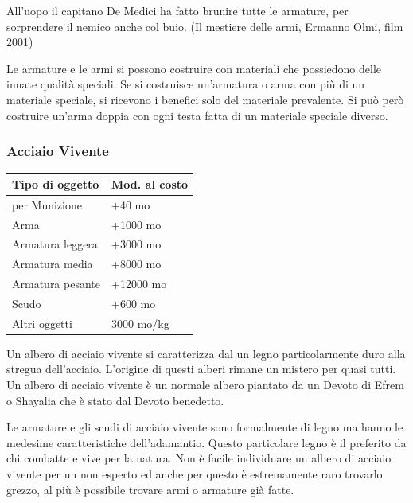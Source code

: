 \begin{enfasi}{
All'uopo il capitano De Medici ha fatto brunire tutte le armature, per sorprendere il nemico anche col buio. (Il mestiere delle armi, Ermanno Olmi, film 2001)}\end{enfasi}

\begin{multicols}{2}

Le armature e le armi si possono costruire con materiali che possiedono delle innate qualità speciali. Se si costruisce un'armatura o arma con più di un materiale speciale, si ricevono i benefici solo del materiale prevalente. Si può però costruire un'arma doppia con ogni testa fatta di un materiale speciale diverso.

\subsubsection{Acciaio Vivente}

\label{acciaio-vivente}

\noindent\begin{tabularx}{\linewidth}{Xl}
	\toprule
\textbf{Tipo di oggetto} & \textbf{Mod. al costo}\\
\toprule
per Munizione & +40 mo \\
Arma & +1000 mo\\
Armatura leggera & +3000 mo\\
Armatura media & +8000 mo\\
Armatura pesante & +12000 mo\\
Scudo & +600 mo\\
Altri oggetti & 3000 mo/kg
\end{tabularx}

\medskip
Un albero di acciaio vivente si caratterizza dal un legno particolarmente duro alla stregua dell'acciaio. L'origine di questi alberi rimane un mistero per quasi tutti. Un albero di acciaio vivente è un normale albero piantato da un Devoto di Efrem o Shayalia che è stato dal Devoto benedetto.

Le armature e gli scudi di acciaio vivente sono formalmente di legno ma hanno le medesime caratteristiche dell'adamantio. Questo particolare legno è il preferito da chi combatte e vive per la natura. Non è facile individuare un albero di acciaio vivente per un non esperto ed anche per questo è estremamente raro trovarlo grezzo, al più è possibile trovare armi o armature già fatte.


\end{multicols}
